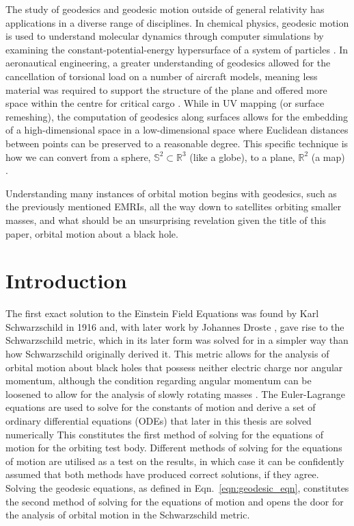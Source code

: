 The study of geodesics and geodesic motion outside of general relativity has applications in a diverse range of disciplines.
In chemical physics, geodesic motion is used to understand molecular dynamics through computer simulations by examining the constant-potential-energy hypersurface of a system of particles \cite{chemPhysApp}.
In aeronautical engineering, a greater understanding of geodesics allowed for the cancellation of torsional load on a number of aircraft models, meaning less material was required to support the structure of the plane and offered more space within the centre for critical cargo \cite{aircraftApp}.
While in UV mapping (or surface remeshing), the computation of geodesics along surfaces allows for the embedding of a high-dimensional space in a low-dimensional space where Euclidean distances between points can be preserved to a reasonable degree.
This specific technique is how we can convert from a sphere, $\mathbb{S}^2\subset \mathbb{R}^3$ (like a globe), to a plane, $\mathbb{R}^2$ (a map) \cite{surfaceMeshApp, uvMapApp}.


Understanding many instances of orbital motion begins with geodesics, such as the previously mentioned EMRIs, all the way down to satellites orbiting smaller masses, and what should be an unsurprising revelation given the title of this paper, orbital motion about a black hole.


\section{Introduction}\label{sec:introduction}

The first exact solution to the Einstein Field Equations was found by Karl Schwarzschild in 1916 \cite{schwarz1916} and, with later work by Johannes Droste \cite{drosteSchwarz}, gave rise to the Schwarzschild metric, which in its later form was solved for in a simpler way than how Schwarzschild originally derived it.
This metric allows for the analysis of orbital motion about black holes that possess neither electric charge nor angular momentum, although the condition regarding angular momentum can be loosened to allow for the analysis of slowly rotating masses \cite{schwarzSlowRot}.
The Euler-Lagrange equations are used to solve for the constants of motion and derive a set of ordinary differential equations (ODEs) that later in this thesis are solved numerically
This constitutes the first method of solving for the equations of motion for the orbiting test body.
Different methods of solving for the equations of motion are utilised as a test on the results, in which case it can be confidently assumed that both methods have produced correct solutions, if they agree.
Solving the geodesic equations, as defined in Eqn.~\eqref{eqn:geodesic_eqn}, constitutes the second method of solving for the equations of motion and opens the door for the analysis of orbital motion in the Schwarzschild metric.

